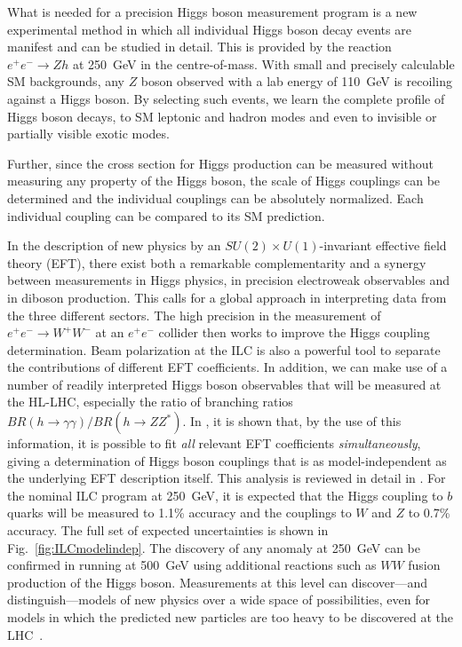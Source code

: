 \documentclass[%
 reprint,
 amsmath,amssymb,
 aps,
]{revtex4-1}
\def\ee{e^+e^-}
\begin{document}
What is needed for a precision Higgs boson measurement program
is a new experimental method in which all individual Higgs boson decay events
are manifest
and can be studied in detail.   This is provided by the reaction
$\ee\to Zh$ at 250~GeV in the centre-of-mass.
  With small and precisely calculable SM backgrounds, any $Z$ boson
  observed with a lab energy of 110~GeV is recoiling against a Higgs
  boson.  By selecting such events, we learn the complete profile of Higgs boson  decays, to SM leptonic and hadron modes and even to invisible or
  partially visible exotic modes. 

Further, since the cross section for Higgs production can be measured
without measuring any property of the Higgs boson, the scale of Higgs
couplings can be determined and the individual couplings can be
absolutely normalized.  Each individual coupling can be compared to
its SM prediction.

In the description of new physics by an $SU(2)\times U(1)$-invariant effective field theory (EFT), there exist both a remarkable complementarity and a synergy between measurements in Higgs physics, in precision electroweak observables and in diboson production. This calls for a global approach in interpreting data from the three different sectors. The high precision in  the measurement of $e^+e^- \to W^+W^-$ at an $e^+e^-$ collider then works to improve the Higgs coupling determination. Beam polarization at the ILC is also a powerful tool
to separate the contributions of different EFT
coefficients.  In addition, we can make use of a number of readily interpreted Higgs boson observables that will be measured at the HL-LHC, especially the 
ratio of branching ratios  $BR(h\to \gamma\gamma)/BR(h\to ZZ^*)$. 
  In \cite{Barklow:2017suo}, it is shown that, by the use of this information, 
  it is possible to fit {\it all}
relevant EFT
coefficients  {\it simultaneously}, giving a 
determination of Higgs boson couplings that is as
model-independent as the underlying EFT description itself. 
 This analysis is reviewed in detail in  \cite{ILCforESS}. 
For the nominal ILC program at 250~GeV, it is expected that the Higgs
coupling to $b$ quarks will be measured to 1.1\% accuracy and the
couplings to $W$ and $Z$ to 0.7\% accuracy.  The full set  of  expected
uncertainties  is shown in Fig.~\ref{fig:ILCmodelindep}.    The 
discovery of any anomaly at 250~GeV can be confirmed in running at
500~GeV 
using additional reactions  such as $WW$ fusion production of the
Higgs boson.   Measurements at this
level can discover---and distinguish---models of new physics over a
wide space of possibilities, even for models in which the predicted new
particles are too heavy to be discovered at the
LHC~\cite{Barklow:2017suo}.
\end{document}
